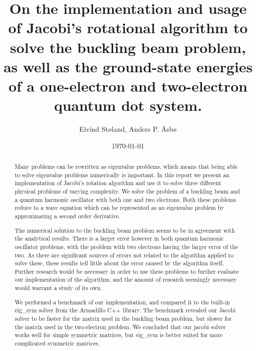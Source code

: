 \documentclass[reprint,english,notitlepage]{revtex4-1}  %
\begin{document}
\title{On the implementation and usage of Jacobi's rotational algorithm to solve the buckling beam problem, as well as the ground-state energies of a one-electron and two-electron quantum dot system.}   %
\author{Eivind Støland, Anders P. Åsbø}               %
\date{\today}                             %
\noaffiliation                            %

\begin{abstract}
Many problems can be rewritten as eigenvalue problems, which means that being able to solve eigenvalue problems numerically is important. In this report we present an implementation of Jacobi's rotation algorithm and use it to solve three different physical problems of varying complexity. We solve the problem of a buckling beam and a quantum harmonic oscillator with both one and two electrons. Both these problems reduce to a wave equation which can be represented as an eigenvalue problem by approximating a second order derivative.

The numerical solution to the buckling beam problem seems to be in agreement with the analytical results. There is a larger error however in both quantum harmonic oscillator problems, with the problem with two electrons having the larger error of the two. As there are significant sources of errors not related to the algorithm applied to solve these, these results tell little about the error caused by the algorithm itself. Further research would be necessary in order to use these problems to further evaluate our implementation of the algorithm, and the amount of research seemingly necessary would warrant a study of its own.

We performed a benchmark of our implementation, and compared it to the built-in eig\_sym solver from the Armadillo C++ library. The benchmark revealed our Jacobi solver to be faster for the matrix used in the buckling beam problem, but slower for the matrix used in the two-electron problem. We concluded that our jacobi solver works well for simple symmetric matrices, but eig\_sym is better suited for more complicated symmetric matrices.
\end{abstract}


\maketitle                                %


\tableofcontents
\end{document}
